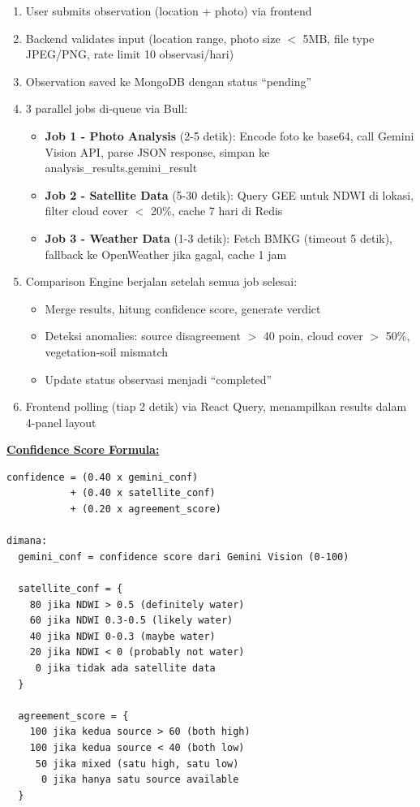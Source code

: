 \documentclass[12pt,a4paper]{article}
\begin{document}
\begin{enumerate}
  \item User submits observation (location + photo) via frontend
  \item Backend validates input (location range, photo size $<$ 5MB, file type JPEG/PNG, rate limit 10 observasi/hari)
  \item Observation saved ke MongoDB dengan status ``pending''
  \item 3 parallel jobs di-queue via Bull:
    \begin{itemize}
      \item \textbf{Job 1 - Photo Analysis} (2-5 detik): Encode foto ke base64, call Gemini Vision API, parse JSON response, simpan ke analysis\_results.gemini\_result
      \item \textbf{Job 2 - Satellite Data} (5-30 detik): Query GEE untuk NDWI di lokasi, filter cloud cover $<$ 20\%, cache 7 hari di Redis
      \item \textbf{Job 3 - Weather Data} (1-3 detik): Fetch BMKG (timeout 5 detik), fallback ke OpenWeather jika gagal, cache 1 jam
    \end{itemize}
  \item Comparison Engine berjalan setelah semua job selesai:
    \begin{itemize}
      \item Merge results, hitung confidence score, generate verdict
      \item Deteksi anomalies: source disagreement $>$ 40 poin, cloud cover $>$ 50\%, vegetation-soil mismatch
      \item Update status observasi menjadi ``completed''
    \end{itemize}
  \item Frontend polling (tiap 2 detik) via React Query, menampilkan results dalam 4-panel layout
\end{enumerate}

\textbf{\underline{Confidence Score Formula:}}

\begin{verbatim}
confidence = (0.40 x gemini_conf)
           + (0.40 x satellite_conf)
           + (0.20 x agreement_score)

dimana:
  gemini_conf = confidence score dari Gemini Vision (0-100)
  
  satellite_conf = {
    80 jika NDWI > 0.5 (definitely water)
    60 jika NDWI 0.3-0.5 (likely water)
    40 jika NDWI 0-0.3 (maybe water)
    20 jika NDWI < 0 (probably not water)
     0 jika tidak ada satellite data
  }
  
  agreement_score = {
    100 jika kedua source > 60 (both high)
    100 jika kedua source < 40 (both low)
     50 jika mixed (satu high, satu low)
      0 jika hanya satu source available
  }
\end{verbatim}
\end{document}
